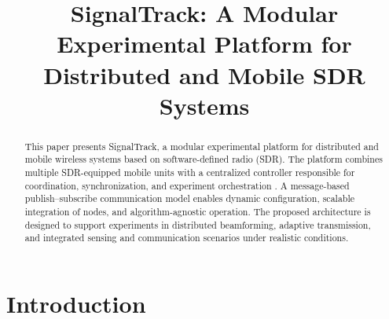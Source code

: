 \documentclass[conference,a4paper]{IEEEtran}
\begin{document}
%

\title{SignalTrack: A Modular Experimental Platform for Distributed and Mobile SDR Systems }


\author{
}

\maketitle 

\begin{abstract}
This paper presents SignalTrack, a modular experimental platform for distributed and mobile wireless systems based on software-defined radio (SDR). The platform combines multiple SDR-equipped mobile units with a centralized controller responsible for coordination, synchronization, and experiment orchestration \cite{MQTTv5}. A message-based publish–subscribe communication model enables dynamic configuration, scalable integration of nodes, and algorithm-agnostic operation. The proposed architecture is designed to support experiments in distributed beamforming, adaptive transmission, and integrated sensing and communication scenarios under realistic conditions.
\end{abstract}

\IEEEpeerreviewmaketitle



\section{Introduction}
\end{document}
